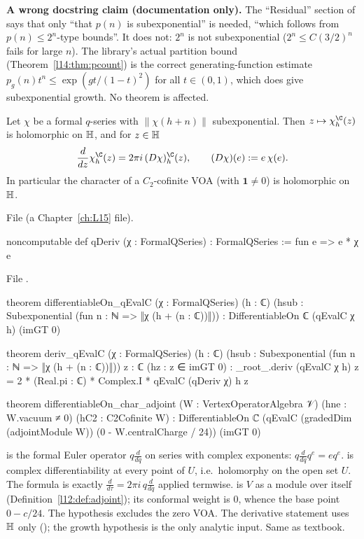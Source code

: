 \begin{warning}
\textbf{A wrong docstring claim (documentation only).} The ``Residual'' section of  says that only
``that $p(n)$ is subexponential'' is needed, ``which follows from $p(n)\le2^n$-type bounds''. It does not: $2^n$ is not
subexponential ($2^n\le C(3/2)^n$ fails for large $n$). The library's actual partition bound (Theorem~\ref{l14:thm:pcount})
is the correct generating-function estimate $p_g(n)t^n\le\exp(gt/(1-t)^2)$ for all $t\in(0,1)$, which does give
subexponential growth. No theorem is affected.
\end{warning}

\begin{theorem}\label{l14:thm:holo}
Let $\chi$ be a formal $q$-series with $\|\chi(h+n)\|$ subexponential. Then $z\mapsto\chi^{\C}_h(z)$ is holomorphic on
$\mathbb{H}$, and for $z\in\mathbb{H}$
\begin{equation*}
  \frac{d}{dz}\chi^{\C}_h(z) = 2\pi i\,(D\chi)^{\C}_h(z),\qquad (D\chi)(e) := e\,\chi(e).
\end{equation*}
In particular the character of a $C_2$-cofinite VOA (with $\mathbf 1\neq0$) is holomorphic on $\mathbb{H}$.
\end{theorem}
\noindent File  (a Chapter~\ref{ch:L15} file).
\begin{leancode}
noncomputable def qDeriv (χ : FormalQSeries) : FormalQSeries := fun e => e * χ e
\end{leancode}
\noindent File .
\begin{leancode}
theorem differentiableOn_qEvalC (χ : FormalQSeries) (h : ℂ)
    (hsub : Subexponential (fun n : ℕ => ‖χ (h + (n : ℂ))‖)) :
    DifferentiableOn ℂ (qEvalC χ h) (imGT 0)

theorem deriv_qEvalC (χ : FormalQSeries) (h : ℂ)
    (hsub : Subexponential (fun n : ℕ => ‖χ (h + (n : ℂ))‖)) {z : ℂ} (hz : z ∈ imGT 0) :
    _root_.deriv (qEvalC χ h) z = 2 * (Real.pi : ℂ) * Complex.I * qEvalC (qDeriv χ) h z

theorem differentiableOn_char_adjoint (W : VertexOperatorAlgebra 𝒱) (hne : W.vacuum ≠ 0)
    (hC2 : C2Cofinite W) :
    DifferentiableOn ℂ
      (qEvalC (gradedDim (adjointModule W)) (0 - W.centralCharge / 24)) (imGT 0)
\end{leancode}
\begin{dictionary}
 is the formal Euler operator $q\frac{d}{dq}$ on series with complex exponents: $q\frac{d}{dq}q^e = eq^e$.
 is complex differentiability at every point of $U$, i.e.\ holomorphy on the open set $U$.
The formula is exactly $\frac{d}{d\tau} = 2\pi i\,q\frac{d}{dq}$ applied termwise.  is $V$ as a module
over itself (Definition~\ref{l12:def:adjoint}); its conformal weight is $0$, whence the base point $0 - c/24$. The hypothesis
 excludes the zero VOA. The derivative statement uses $\mathbb{H}$ only (); the growth hypothesis is the
only analytic input. Same as textbook.
\end{dictionary}
